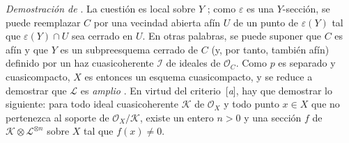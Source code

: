 \documentclass[oneside,10pt]{amsart}
\newcommand{\oldpage}[2][]{\marginnote{\normalfont\footnotesize\textbf{#1}~|~#2}\ignorespaces}
\let\EGAOriginalLabel\label
\renewcommand{\label}[1]{\phantomsection\EGAOriginalLabel{#1}}
\begin{document}
\begin{env}[8.10.6]
\label{II.8.10.6-fr}
\emph{Demostración de} .
La cuestión es local sobre $Y$ ;
como $\varepsilon$ es una $Y$-sección, se puede reemplazar $C$ por una vecindad abierta afín $U$ de un punto de $\varepsilon(Y)$ tal que $\varepsilon(Y)\cap U$ sea cerrado en $U$.
En otras palabras, se puede suponer que $C$ es afín y que $Y$ es un subpreesquema cerrado de $C$ (y, por tanto, también afín) definido por un haz cuasicoherente
\oldpage[II]{188}
$\mathcal{I}$ de ideales de $\mathcal{O}_C$.
Como $p$ es separado y cuasicompacto, $X$ es entonces un esquema cuasicompacto, y se reduce a demostrar que $\mathcal{L}$ es \emph{amplio} .
En virtud del criterio~[\emph{a}], hay que demostrar lo siguiente:
para todo ideal cuasicoherente $\mathcal{K}$ de $\mathcal{O}_X$ y todo punto $x\in X$ que no pertenezca al soporte de $\mathcal{O}_X/\mathcal{K}$, existe un entero $n>0$ y una sección $f$ de $\mathcal{K}\otimes\mathcal{L}^{\otimes n}$ sobre $X$ tal que $f(x)\neq0$.


\end{env}
\end{document}
